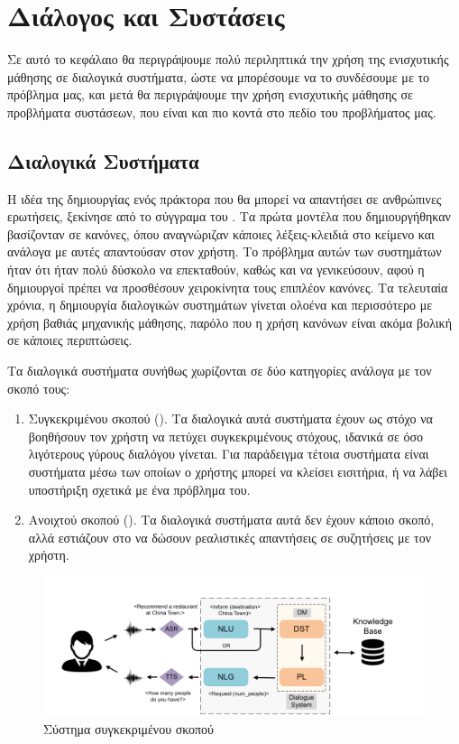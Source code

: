 \chapter{Διάλογος και Συστάσεις}
\label{chap:dialogue_and_recommendations}
Σε αυτό το κεφάλαιο θα περιγράψουμε πολύ περιληπτικά την χρήση της ενισχυτικής μάθησης σε διαλογικά συστήματα, ώστε να μπορέσουμε να το συνδέσουμε με το πρόβλημα μας, και μετά θα περιγράψουμε την χρήση ενισχυτικής μάθησης σε προβλήματα συστάσεων, που είναι και πιο κοντά στο πεδίο του προβλήματος μας.

\section{Διαλογικά Συστήματα}

Η ιδέα της δημιουργίας ενός πράκτορα που θα μπορεί να απαντήσει σε ανθρώπινες ερωτήσεις, ξεκίνησε από το σύγγραμα του  \cite{turing1950computing}. Τα πρώτα μοντέλα που δημιουργήθηκαν βασίζονταν σε κανόνες, όπου αναγνώριζαν κάποιες λέξεις-κλειδιά στο κείμενο και ανάλογα με αυτές απαντούσαν στον χρήστη. Το πρόβλημα αυτών των συστημάτων ήταν ότι ήταν πολύ δύσκολο να επεκταθούν, καθώς και να γενικεύσουν, αφού η δημιουργοί πρέπει να προσθέσουν χειροκίνητα τους επιπλέον κανόνες. Τα τελευταία χρόνια, η δημιουργία διαλογικών συστημάτων γίνεται ολοένα και περισσότερο με χρήση βαθιάς μηχανικής μάθησης, παρόλο που η χρήση κανόνων είναι ακόμα βολική σε κάποιες περιπτώσεις.

Tα διαλογικά συστήματα συνήθως χωρίζονται σε δύο κατηγορίες ανάλογα με τον σκοπό τους:
\begin{enumerate}
    \item Συγκεκριμένου σκοπού (). Τα διαλογικά αυτά συστήματα έχουν ως στόχο να βοηθήσουν τον χρήστη να πετύχει συγκεκριμένους στόχους, ιδανικά σε όσο λιγότερους γύρους διαλόγου γίνεται. Για παράδειγμα τέτοια συστήματα είναι συστήματα μέσω των οποίων ο χρήστης μπορεί να κλείσει εισιτήρια, ή να λάβει υποστήριξη σχετικά με ένα πρόβλημα του.
    \item Ανοιχτού σκοπού (). Τα διαλογικά συστήματα αυτά δεν έχουν κάποιο σκοπό, αλλά εστιάζουν στο να δώσουν ρεαλιστικές απαντήσεις σε συζητήσεις με τον χρήστη.
\end{enumerate}

\begin{figure}
    \centering
    \includegraphics[width=\textwidth]{body_matter/dialogue_and_recommendations/images/task-based-dialogue-system.png}
    \caption{Σύστημα συγκεκριμένου σκοπού \cite{recent_advances_dl_2021}}
    \label{fig:task_based_system}
\end{figure}

